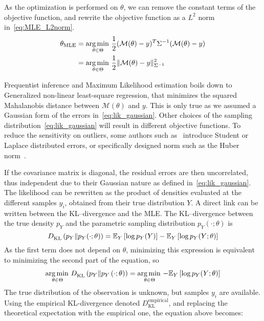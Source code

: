 \documentclass[../../Main_ManuscritThese.tex]{subfiles}
\begin{document}
As the optimization is performed on $\theta$, we can remove the constant terms of the objective function, and rewrite the objective function as a $L^2$ norm in~\cref{eq:MLE_L2norm}.  %
  \begin{align}
    {\theta}_{\mathrm{MLE}} &= \operatorname*{arg\,min \,}_{\theta \in \Theta}\frac{1}{2}(\mathcal{M}(\theta) - y)^T\Sigma^{-1}(\mathcal{M}(\theta) - y) \nonumber\\
                           &= \operatorname*{arg\,min \,}_{\theta \in \Theta}\frac12 \| \mathcal{M}(\theta) - y \|^2_{\Sigma^{-1}} \label{eq:MLE_L2norm}
  \end{align}

  Frequentist inference and Maximum Likelihood estimation boils down to Generalized non-linear least-square regression, that minimizes the squared Mahalanobis distance between $\mathcal{M}({\theta})$ and $y$. This is only true as we assumed a Gaussian form of the errors in~\cref{eq:lik_gaussian}. Other choices of the sampling distribution~\cref{eq:lik_gaussian} will result in different objective functions. To reduce the sensitivity on outliers, some authors such as~\cite{rao_robust_2015} introduce Student or Laplace distributed errors, or specifically designed norm such as the Huber norm~\cite{huber_robust_2011}.

  If the covariance matrix is diagonal, the residual errors are then uncorrelated, thus independent due to their Gaussian nature as defined in~\cref{eq:lik_gaussian}. The likelihood can be rewritten as the product of densities evaluated at the different samples $y_i$, obtained from their true distribution $Y$.
  A direct link can be written between the KL--divergence and the MLE. The KL--divergence between the true density $p_Y$ and the parametric sampling distribution $p_Y(\cdot;\theta)$ is
  \begin{equation}
  D^{\mathrm{}}_{\mathrm{KL}}\left(p_Y \| p_Y(\cdot;\theta)\right) = \mathbb{E}_Y\left[\log p_Y(Y)\right]-\mathbb{E}_Y\left[\log p_Y(Y;\theta)\right]  
\end{equation}
As the first term does not depend on $\theta$, minimizing this expression is equivalent to minimizing the second part of the equation, so
\begin{align}
 \operatorname*{arg\,min \,}_{\theta \in\Theta} D^{\mathrm{}}_{\mathrm{KL}}\left(p_Y \| p_Y\left(\cdot;\theta \right)\right) = \operatorname*{arg\,min \,}_{\theta \in \Theta} -\mathbb{E}_{Y}\left[\log p_{Y}(Y ; \theta)\right]
\end{align}
The true distribution of the observation is unknown, but samples $y_i$ are available. Using the empirical KL-divergence denoted $D^{\mathrm{empirical}}_{\mathrm{KL}}$,  and replacing the theoretical expectation with the empirical one, the equation above becomes:
\end{document}
